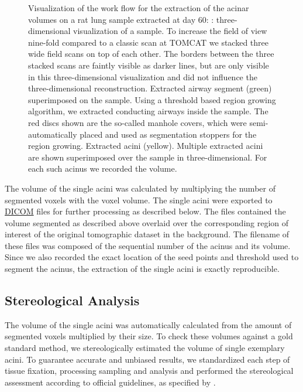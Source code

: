 \documentclass[twoside,paper=a4,abstract=true,english,DIV=calc]{scrartcl}
\newlength\imagescale		%
\begin{document}
\begin{figure}
{%
		\label{subfig:extracted acini}%
		}
	\caption{Visualization of the work flow for the extraction of the acinar volumes on a rat lung sample extracted at day 60: %
		\protect{}: three-dimensional visualization of a sample. To increase the field of view nine-fold compared to a classic scan at TOMCAT we stacked three wide field scans on top of each other. The borders between the three stacked scans are faintly visible as darker lines, but are only visible in this three-dimensional visualization and did not influence the three-dimensional reconstruction. %
		\protect{} Extracted airway segment (green) superimposed on the sample. Using a threshold based region growing algorithm, we extracted conducting airways inside the sample. The red discs shown are the so-called manhole covers, which were semi-automatically placed and used as segmentation stoppers for the region growing. %
		\protect{} Extracted acini (yellow). Multiple extracted acini are shown superimposed over the sample in three-dimensional. For each such acinus we recorded the volume.%
		}
	\label{fig:workflow}
\end{figure}

The volume of the single acini was calculated by multiplying the number of segmented voxels with the voxel volume. The single acini were exported to \href{https://secure.wikimedia.org/wikipedia/en/w/index.php?title=Digital_Imaging_and_Communications_in_Medicine&oldid=415023605}{DICOM} files for further processing as described below. The files contained the volume segmented as described above overlaid over the corresponding region of interest of the original tomographic dataset in the background. The filename of these files was composed of the sequential number of the acinus and its volume. Since we also recorded the exact location of the seed points and threshold used to segment the acinus, the extraction of the single acini is exactly reproducible.

\subsection{Stereological Analysis}
The volume of the single acini was automatically calculated from the amount of segmented voxels multiplied by their size. To check these volumes against a gold standard method, we stereologically estimated the volume of single exemplary acini. To guarantee accurate and unbiased results, we standardized each step of tissue fixation, processing sampling and analysis and performed the stereological assessment according to official guidelines, as specified by \citet{Hsia2010}.
\end{document}
